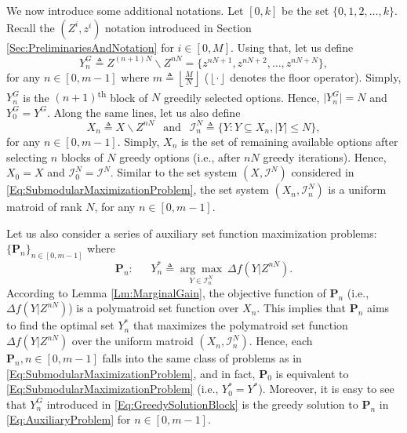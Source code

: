 \documentclass[letterpaper, 10 pt, conference]{ieeeconf}
\begin{document}
{%
We now introduce some additional notations. Let $[0,k]$ be the set $\{0,1,2,\ldots,k\}$. Recall the $(Z^i,z^i)$ notation introduced in Section \ref{Sec:PreliminariesAndNotation} for $i\in [0,M]$. Using that, let us define
\begin{equation}\label{Eq:GreedySolutionBlock}
    Y^G_n \triangleq Z^{(n+1)N} \backslash Z^{nN} = \{z^{nN+1},z^{nN+2},\ldots,z^{nN+N}\}, 
\end{equation}
for any $n\in[0,m-1]$ where $m \triangleq \left \lfloor{\frac{M}{N}}\right \rfloor$ ($\left \lfloor{\cdot}\right \rfloor$ denotes the floor operator). Simply, $Y^G_n$ is the $(n+1)$\textsuperscript{th} block of $N$ greedily selected options. Hence, $\vert Y^G_n \vert = N$ and $Y^G_0 = Y^G$. Along the same lines, let us also define 
\begin{equation}\label{Eq:groundSetBlock}
X_n \triangleq X\backslash Z^{nN} \ \ \mbox{ and } \ \  \mathcal{I}_n^N \triangleq \{Y:Y \subseteq X_n, \vert Y \vert \leq N\},   
\end{equation}
for any $n\in[0,m-1]$. Simply, $X_n$ is the set of remaining available options after selecting $n$ blocks of $N$ greedy options (i.e., after $nN$ greedy iterations). Hence, $X_0 = X$ and $\mathcal{I}_0^N = \mathcal{I}^N$. Similar to the set system $(X,\mathcal{I}^N)$ considered in \eqref{Eq:SubmodularMaximizationProblem}, the set system $(X_n,\mathcal{I}_n^N)$ is a uniform matroid of rank $N$, for any $n\in[0,m-1]$. 


Let us also consider a series of auxiliary set function maximization problems: $\{\mathbf{P}_n\}_{n\in [0,m-1]}$ where 
\begin{equation}\label{Eq:AuxiliaryProblem}
    \mathbf{P}_n :\ \ \ \ \ \ \ Y^*_n \triangleq \underset{Y\in\mathcal{I}^N_n}{\arg\max}\ \Delta f(Y\vert Z^{nN}).
\end{equation}
According to Lemma \ref{Lm:MarginalGain}, the objective function of $\mathbf{P}_n$ (i.e., $\Delta f(Y\vert Z^{nN})$) is a polymatroid set function over $X_n$. This implies that $\mathbf{P}_n$ aims to find the optimal set $Y^*_n$ that maximizes the polymatroid set function $\Delta f(Y\vert Z^{nN})$ over the uniform matroid $(X_n,\mathcal{I}^N_n)$. Hence, each $\mathbf{P}_n, n\in [0,m-1]$ falls into the same class of problems as in \eqref{Eq:SubmodularMaximizationProblem}, and in fact, $\mathbf{P}_0$ is equivalent to \eqref{Eq:SubmodularMaximizationProblem} (i.e., $Y^*_0 = Y^*$). Moreover, it is easy to see that $Y^G_n$ introduced in \eqref{Eq:GreedySolutionBlock} is the greedy solution to $\mathbf{P}_n$ in \eqref{Eq:AuxiliaryProblem} for $n\in[0,m-1]$.  


}
\end{document}

